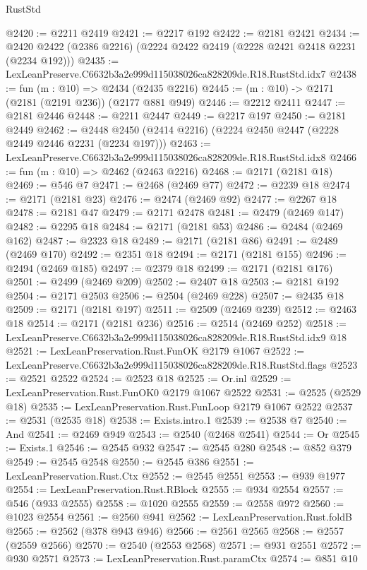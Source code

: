 \begin{lexlean}{RustStd}
\begin{coremodule}
@2420 := @2211 @2419
@2421 := @2217 @192
@2422 := @2181 @2421
@2434 := @2420 @2422 (@2386 @2216) (@2224 @2422 @2419 (@2228 @2421 @2418 @2231 (@2234 @192)))
@2435 := LexLeanPreserve.C6632b3a2e999d115038026ca828209de.R18.RustStd.idx7
@2438 := fun (m : @10) => @2434 (@2435 @2216)
@2445 := (m : @10) -> @2171 (@2181 (@2191 @236)) (@2177 @881 @949)
@2446 := @2212 @2411
@2447 := @2181 @2446
@2448 := @2211 @2447
@2449 := @2217 @197
@2450 := @2181 @2449
@2462 := @2448 @2450 (@2414 @2216) (@2224 @2450 @2447 (@2228 @2449 @2446 @2231 (@2234 @197)))
@2463 := LexLeanPreserve.C6632b3a2e999d115038026ca828209de.R18.RustStd.idx8
@2466 := fun (m : @10) => @2462 (@2463 @2216)
@2468 := @2171 (@2181 @18)
@2469 := @546 @7
@2471 := @2468 (@2469 @77)
@2472 := @2239 @18
@2474 := @2171 (@2181 @23)
@2476 := @2474 (@2469 @92)
@2477 := @2267 @18
@2478 := @2181 @47
@2479 := @2171 @2478
@2481 := @2479 (@2469 @147)
@2482 := @2295 @18
@2484 := @2171 (@2181 @53)
@2486 := @2484 (@2469 @162)
@2487 := @2323 @18
@2489 := @2171 (@2181 @86)
@2491 := @2489 (@2469 @170)
@2492 := @2351 @18
@2494 := @2171 (@2181 @155)
@2496 := @2494 (@2469 @185)
@2497 := @2379 @18
@2499 := @2171 (@2181 @176)
@2501 := @2499 (@2469 @209)
@2502 := @2407 @18
@2503 := @2181 @192
@2504 := @2171 @2503
@2506 := @2504 (@2469 @228)
@2507 := @2435 @18
@2509 := @2171 (@2181 @197)
@2511 := @2509 (@2469 @239)
@2512 := @2463 @18
@2514 := @2171 (@2181 @236)
@2516 := @2514 (@2469 @252)
@2518 := LexLeanPreserve.C6632b3a2e999d115038026ca828209de.R18.RustStd.idx9 @18
@2521 := LexLeanPreservation.Rust.FunOK @2179 @1067
@2522 := LexLeanPreserve.C6632b3a2e999d115038026ca828209de.R18.RustStd.flags
@2523 := @2521 @2522
@2524 := @2523 @18
@2525 := Or.inl
@2529 := LexLeanPreservation.Rust.FunOK0 @2179 @1067 @2522
@2531 := @2525 (@2529 @18)
@2535 := LexLeanPreservation.Rust.FunLoop @2179 @1067 @2522
@2537 := @2531 (@2535 @18)
@2538 := Exists.intro.{1}
@2539 := @2538 @7
@2540 := And
@2541 := @2469 @949
@2543 := @2540 (@2468 @2541)
@2544 := Or
@2545 := Exists.{1}
@2546 := @2545 @932
@2547 := @2545 @280
@2548 := @852 @379
@2549 := @2545 @2548
@2550 := @2545 @386
@2551 := LexLeanPreservation.Rust.Ctx
@2552 := @2545 @2551
@2553 := @939 @1977
@2554 := LexLeanPreservation.Rust.RBlock
@2555 := @934 @2554
@2557 := @546 (@933 @2555)
@2558 := @1020 @2555
@2559 := @2558 @972
@2560 := @1023 @2554
@2561 := @2560 @941
@2562 := LexLeanPreservation.Rust.foldB
@2565 := @2562 (@378 @943 @946)
@2566 := @2561 @2565
@2568 := @2557 (@2559 @2566)
@2570 := @2540 (@2553 @2568)
@2571 := @931 @2551
@2572 := @930 @2571
@2573 := LexLeanPreservation.Rust.paramCtx
@2574 := @851 @10

\end{coremodule}
\end{lexlean}

